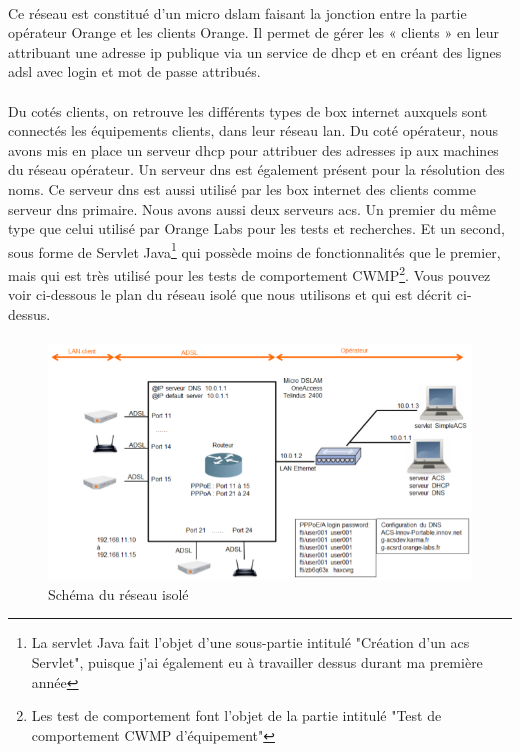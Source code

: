 \documentclass[12pt,a4paper]{report}
\begin{document}
\paragraph*{}Ce réseau est constitué d’un micro \gls{dslam} faisant la jonction entre la partie opérateur Orange et les clients Orange. Il permet de gérer les « clients » en leur attribuant une adresse \gls{ip} publique via un service de \gls{dhcp} et en créant des lignes \gls{adsl} avec login et mot de passe attribués. 
\paragraph*{}Du cotés clients, on retrouve les différents types de box internet auxquels sont connectés les équipements clients, dans leur réseau \gls{lan}. 
Du coté opérateur, nous avons mis en place un serveur \gls{dhcp} pour attribuer des adresses \gls{ip} aux machines du réseau opérateur. Un serveur \gls{dns} est également présent pour la résolution des noms. Ce serveur \gls{dns} est aussi utilisé par les box internet des clients comme serveur \gls{dns} primaire. Nous avons aussi deux serveurs \gls{acs}. Un premier du même type que celui utilisé par Orange Labs pour les tests et recherches. Et un second, sous forme de Servlet Java\footnote{La servlet Java fait l'objet d'une sous-partie intitulé "Création d'un \gls{acs} Servlet", puisque j'ai également eu à travailler dessus durant ma première année} qui possède moins de fonctionnalités que le premier, mais qui est très utilisé pour les tests de comportement CWMP\footnote{Les test de comportement font l'objet de la partie intitulé "Test de comportement CWMP d'équipement"}. Vous pouvez voir ci-dessous le plan du réseau isolé que nous utilisons et qui est décrit ci-dessus.
\paragraph*{}
\begin{figure}[!ht]
    \center
    \includegraphics[scale=0.7]{./img/reseau_isole.png}
    \caption{Schéma du réseau isolé}
\end{figure}
\end{document}
